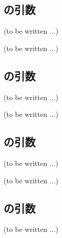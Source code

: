 \subsection{\Mcenterline の引数\TBW}
(to be written ...)



\clearpage
(to be written ...)


\subsection{\KTanmenRight の引数\TBW}
(to be written ...)



\clearpage
(to be written ...)


\subsection{\KGaisakuRLeft の引数\TBW}
(to be written ...)



\clearpage
(to be written ...)


\subsection{\KMizoConerLeft の引数\TBW}
(to be written ...)



